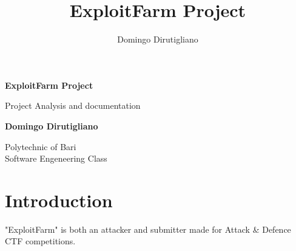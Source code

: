 \documentclass[11pt]{article}
\title{ExploitFarm Project}
\author{Domingo Dirutigliano}
\begin{document}
\begin{titlepage}
   \begin{center}
       \vspace*{1cm}

       \textbf{ExploitFarm Project}

       \vspace{0.5cm}
        Project Analysis and documentation
            
       \vspace{1.5cm}

       \textbf{Domingo Dirutigliano}

       \vfill
            
       Polytechnic of Bari\\
       Software Engeneering Class
            
       \vspace{0.8cm}
   \end{center}
\end{titlepage}

\section{Introduction}
"ExploitFarm" is both an attacker and submitter made for Attack \& Defence CTF competitions.
\end{document}
